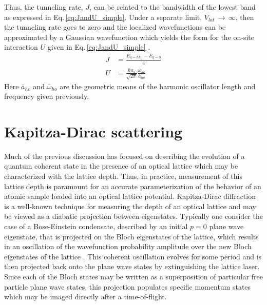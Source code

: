 Thus, the tunneling rate, $J$, can be related to the bandwidth of the lowest band as expressed in Eq.\,\ref{eq:JandU_simple}.
Under a separate limit, $V_{lat}\,\rightarrow\,\infty$, then the tunneling rate goes to zero and the localized wavefunctions can be approximated by a Gaussian wavefunction which yields the form for the on-site interaction $U$ given in Eq.\,\ref{eq:JandU_simple} \cite{Rey2004}.
	\begin{equation} \label{eq:JandU_simple}
	\begin{aligned}
		 J &= \frac{E_{q=\hbar k_L} - E_{q=0}}{4}\\
		 U &= \frac{\hbar a_s}{\sqrt{2 \pi}}\frac{\bar{\omega}_{ho}}{\bar{a}_{ho}}
	\end{aligned}
	\end{equation}
Here $\bar{a}_{ho}$ and $\bar{\omega}_{ho}$ are the geometric means of the harmonic oscillator length and frequency given previously.

\section{Kapitza-Dirac scattering} \label{sec:latKD}
Much of the previous discussion has focused on describing the evolution of a quantum coherent state in the presence of an optical lattice which may be characterized with the lattice depth.
Thus, in practice, measurement of this lattice depth is paramount for an accurate parameterization of the behavior of an atomic sample loaded into  an optical lattice potential.
Kapitza-Dirac diffraction is a well-known technique for measuring the depth of an optical lattice \cite{Denschlag2002} and may be viewed as a diabatic projection between eigenstates.
Typically one consider the case of a Bose-Einstein condensate, described by an initial $p=0$ plane wave eigenstate, that is projected on the Bloch eigenstates of the lattice, which results in an oscillation of the wavefunction probability amplitude over the new Bloch eigenstates of the lattice \cite{gfo08,Rey2004,MarkusGreiner2003}.
This coherent oscillation evolves for some period and is then projected back onto the plane wave states by extinguishing the lattice laser.
Since each of the Bloch states may be written as a superposition of particular free particle plane wave states, this projection populates specific momentum states which may be imaged directly after a time-of-flight.

